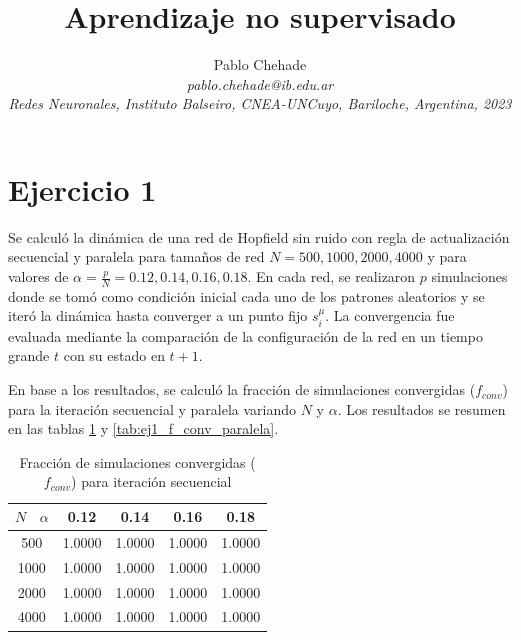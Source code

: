 \documentclass[aps,prb,twocolumn,superscriptaddress,floatfix,longbibliography]{revtex4-2}
\newcounter{para}
\begin{document}
\newcommand{\mytitle}{Aprendizaje no supervisado}

\title{\mytitle}

\author{Pablo Chehade \\
    \small \textit{pablo.chehade@ib.edu.ar} \\
    \small \textit{Redes Neuronales, Instituto Balseiro, CNEA-UNCuyo, Bariloche, Argentina, 2023} \\}
    
\maketitle


\section*{Ejercicio 1}



Se calculó la dinámica de una red de Hopfield sin ruido con regla de actualización secuencial y paralela para tamaños de red \( N = 500, 1000, 2000, 4000 \) y para valores de \( \alpha = \frac{p}{N} = 0.12, 0.14, 0.16, 0.18 \). En cada red, se realizaron \( p \) simulaciones donde se tomó como condición inicial cada uno de los patrones aleatorios y se iteró la dinámica hasta converger a un punto fijo \( s_i^{\mu} \). La convergencia fue evaluada mediante la comparación de la configuración de la red en un tiempo grande \( t \) con su estado en \( t+1 \).

En base a los resultados, se calculó la fracción de simulaciones convergidas (\( f_{conv} \)) para la iteración secuencial y paralela variando $N$ y $\alpha$. Los resultados se resumen en las tablas \ref{tab:ej1_f_conv_secuencial} y \ref{tab:ej1_f_conv_paralela}.

\begin{table}[h]
  \centering
  \caption{Fracción de simulaciones convergidas (\( f_{conv} \)) para iteración secuencial}
  \label{tab:ej1_f_conv_secuencial}
  \begin{tabular}{|c|c|c|c|c|}
  \hline
  \( N \) \ \( \alpha \) & 0.12   & 0.14   & 0.16   & 0.18   \\ \hline
  500            & 1.0000 & 1.0000 & 1.0000 & 1.0000 \\ \hline
  1000           & 1.0000 & 1.0000 & 1.0000 & 1.0000 \\ \hline
  2000           & 1.0000 & 1.0000 & 1.0000 & 1.0000 \\ \hline
  4000           & 1.0000 & 1.0000 & 1.0000 & 1.0000 \\ \hline
  \end{tabular}
\end{table}
  
\end{document}
